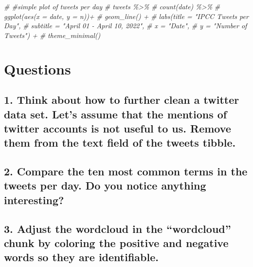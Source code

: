 \documentclass[
]{article}
\newenvironment{Shaded}{\begin{snugshade}}{\end{snugshade}}
\newcommand{\CommentTok}[1]{\textcolor[rgb]{0.56,0.35,0.01}{\textit{#1}}}
\begin{document}
\begin{Shaded}
\begin{Highlighting}[]
\CommentTok{\# \#simple plot of tweets per day}
\CommentTok{\# tweets \%\textgreater{}\%}
\CommentTok{\#   count(date) \%\textgreater{}\%}
\CommentTok{\#   ggplot(aes(x = date, y = n))+}
\CommentTok{\#   geom\_line() +}
\CommentTok{\#   labs(title = "IPCC Tweets per Day",}
\CommentTok{\#        subtitle = "April 01 {-} April 10, 2022",}
\CommentTok{\#        x = "Date",}
\CommentTok{\#        y = "Number of Tweets") + }
\CommentTok{\#   theme\_minimal()}
\end{Highlighting}
\end{Shaded}

\hypertarget{questions}{%
\section{Questions}\label{questions}}

\hypertarget{think-about-how-to-further-clean-a-twitter-data-set.-lets-assume-that-the-mentions-of-twitter-accounts-is-not-useful-to-us.-remove-them-from-the-text-field-of-the-tweets-tibble.}{%
\subsection{1. Think about how to further clean a twitter data set.
Let's assume that the mentions of twitter accounts is not useful to us.
Remove them from the text field of the tweets
tibble.}\label{think-about-how-to-further-clean-a-twitter-data-set.-lets-assume-that-the-mentions-of-twitter-accounts-is-not-useful-to-us.-remove-them-from-the-text-field-of-the-tweets-tibble.}}

\hypertarget{compare-the-ten-most-common-terms-in-the-tweets-per-day.-do-you-notice-anything-interesting}{%
\subsection{2. Compare the ten most common terms in the tweets per day.
Do you notice anything
interesting?}\label{compare-the-ten-most-common-terms-in-the-tweets-per-day.-do-you-notice-anything-interesting}}

\hypertarget{adjust-the-wordcloud-in-the-wordcloud-chunk-by-coloring-the-positive-and-negative-words-so-they-are-identifiable.}{%
\subsection{3. Adjust the wordcloud in the ``wordcloud'' chunk by
coloring the positive and negative words so they are
identifiable.}\label{adjust-the-wordcloud-in-the-wordcloud-chunk-by-coloring-the-positive-and-negative-words-so-they-are-identifiable.}}
\end{document}
